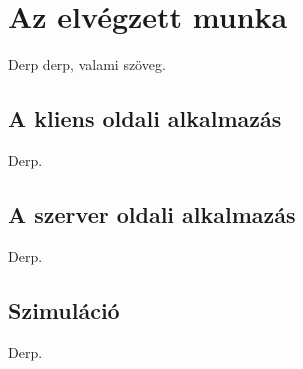 \chapter{Az elvégzett munka}
Derp derp, valami szöveg\cite{Wettl04}. 



\section{A kliens oldali alkalmazás}
Derp.



\section{A szerver oldali alkalmazás}
Derp.


\section{Szimuláció}
Derp.

